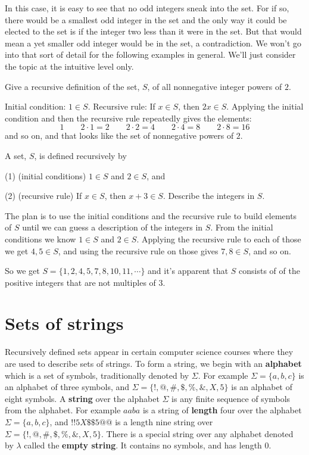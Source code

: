 In this case, it is easy to see that no odd integers sneak into the set. For if so,
there would be a smallest odd integer in the set and the only way it could be elected to
the set is if the integer two less than it were in the set. But that would mean a 
yet smaller odd integer would be in the set, a contradiction. We won't go into that 
sort of  detail
for the following examples in general. We'll just consider the topic at the
intuitive level only. 


\begin{exmp} Give a recursive definition of the set, $S$,  of all nonnegative integer
powers of $2$.

Initial condition: $1\in S$.  Recursive rule: If $x\in S$, then $2x\in S$. Applying the initial
condition and then the recursive rule repeatedly gives the elements:
$$
1\qquad 2\cdot1=2\qquad 2\cdot 2 = 4\qquad 2\cdot 4 = 8\qquad 2\cdot 8 = 16
$$
and so on, and that looks like the set of nonnegative powers of $2$.
\end{exmp}

\begin{exmp} A set, $S$, is defined recursively by 

(1) (initial conditions) $1\in S$
and $2\in S$, and 

(2) (recursive rule) If $x\in S$, then $x+3\in S$. Describe the 
integers in $S$.

The plan is to use the initial conditions and the recursive rule
to build elements of $S$ until we can guess a description of the
integers in $S$.
From the initial conditions we know $1\in S$ and $2\in S$. Applying the
recursive rule to each of those we get $4,5\in S$, and using the 
recursive rule on those gives $7, 8\in S$, and so on.

So we get $S=\{1,2,4,5,7,8,10,11,\cdots\}$ and it's apparent that
$S$ consists of of the positive integers that are not multiples of $3$.
\end{exmp}

\section{Sets of strings}
Recursively defined sets appear in certain computer science courses where 
they are used to
describe sets of strings. To form a string, we begin with an 
{\bf alphabet} which
is a set of symbols, traditionally denoted by $\Sigma$.
 For example $\Sigma = \{ a,b,c\}$ is an alphabet of three symbols,
and $\Sigma= \{!, @, \#, \$, \%, \&, X, 5\}$ is an alphabet of eight symbols. 
A {\bf string} over the alphabet $\Sigma$ is any finite sequence of symbols from the alphabet.
For example $aaba$ is a string of {\bf length} four over the alphabet 
$\Sigma = \{ a,b,c\}$, and $!!5X\$\$5@@$ is a length nine string over
$\Sigma= \{!, @, \#, \$, \%, \&, X, 5\}$. There is a special string over any 
alphabet denoted by $\lambda$ called the {\bf empty string}. It
contains no symbols, and has length $0$.

